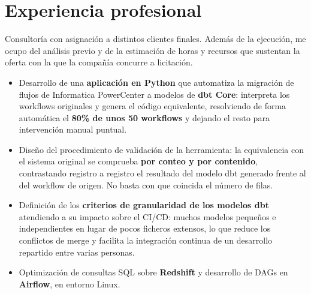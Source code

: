 \documentclass[10pt]{article}
\begin{document}
\section{Experiencia profesional}

\vspace{0.1cm}
Consultoría con asignación a distintos clientes finales. Además de la ejecución, me ocupo del análisis previo y de la estimación de horas y recursos que sustentan la oferta con la que la compañía concurre a licitación.

\begin{itemize}
    \item Desarrollo de una \textbf{aplicación en Python} que automatiza la migración de flujos de Informatica PowerCenter a modelos de \textbf{dbt Core}: interpreta los workflows originales y genera el código equivalente, resolviendo de forma automática el \textbf{80\% de unos 50 workflows} y dejando el resto para intervención manual puntual.
    \item Diseño del procedimiento de validación de la herramienta: la equivalencia con el sistema original se comprueba \textbf{por conteo y por contenido}, contrastando registro a registro el resultado del modelo dbt generado frente al del workflow de origen. No basta con que coincida el número de filas.
    \item Definición de los \textbf{criterios de granularidad de los modelos dbt} atendiendo a su impacto sobre el CI/CD: muchos modelos pequeños e independientes en lugar de pocos ficheros extensos, lo que reduce los conflictos de merge y facilita la integración continua de un desarrollo repartido entre varias personas.
    \item Optimización de consultas SQL sobre \textbf{Redshift} y desarrollo de DAGs en \textbf{Airflow}, en entorno Linux.
\end{itemize}
\end{document}
